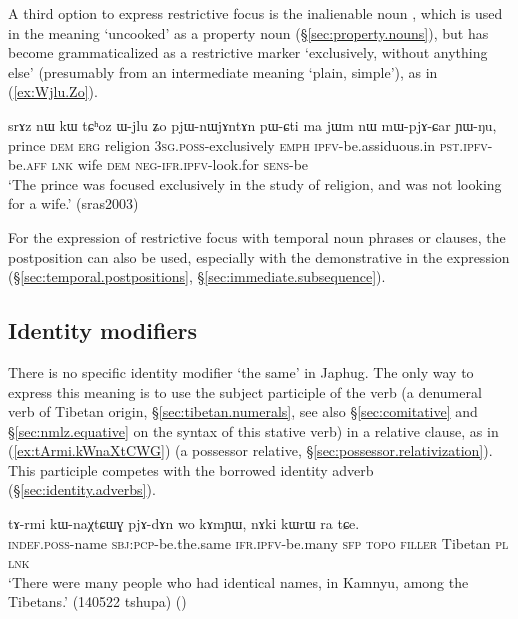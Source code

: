 A third option to express restrictive focus is the inalienable noun , which is used in the meaning `uncooked' as a property noun (§\ref{sec:property.nouns}), but has become grammaticalized as a restrictive marker `exclusively, without anything else' (presumably from an intermediate meaning `plain, simple'), as in (\ref{ex:Wjlu.Zo}).

\begin{exe}
\ex \label{ex:Wjlu.Zo}
 \gll srɤz nɯ kɯ tɕʰoz ɯ-jlu ʑo pjɯ-nɯjɤntɤn pɯ-ɕti ma jɯm nɯ mɯ-pjɤ-ɕar ɲɯ-ŋu, \\
prince \textsc{dem} \textsc{erg}  religion \textsc{3sg}.\textsc{poss}-exclusively \textsc{emph} \textsc{ipfv}-be.assiduous.in  \textsc{pst}.\textsc{ipfv}-be.\textsc{aff} \textsc{lnk} wife \textsc{dem} \textsc{neg}-\textsc{ifr}.\textsc{ipfv}-look.for \textsc{sens}-be \\
 \glt `The prince was focused exclusively in the study of religion, and was not looking for a wife.' (sras2003)
 \end{exe}

For the expression of restrictive focus with temporal noun phrases or clauses, the postposition  can also be used, especially with the demonstrative in the expression  (§\ref{sec:temporal.postpositions}, §\ref{sec:immediate.subsequence}).



\subsection{Identity modifiers} \label{sec:identity.modifier}
There is no specific identity modifier `the same' in Japhug. The only way to express this meaning is to use the subject participle of the verb  (a denumeral verb of Tibetan origin, §\ref{sec:tibetan.numerals}, see also §\ref{sec:comitative} and §\ref{sec:nmlz.equative} on the syntax of this stative verb) in a relative clause, as in (\ref{ex:tArmi.kWnaXtCWG}) (a possessor relative, §\ref{sec:possessor.relativization}). This participle competes with the borrowed identity adverb  (§\ref{sec:identity.adverbs}).

\begin{exe}
\ex \label{ex:tArmi.kWnaXtCWG}
\gll tɤ-rmi kɯ-naχtɕɯɣ pjɤ-dɤn wo kɤmɲɯ, nɤki kɯrɯ ra tɕe. \\
\textsc{indef}.\textsc{poss}-name \textsc{sbj}:\textsc{pcp}-be.the.same \textsc{ifr}.\textsc{ipfv}-be.many \textsc{sfp}  \textsc{topo} \textsc{filler} Tibetan \textsc{pl} \textsc{lnk} \\
\glt `There were many people who had identical names, in Kamnyu, among the Tibetans.' (140522 tshupa) 	()
\end{exe}


